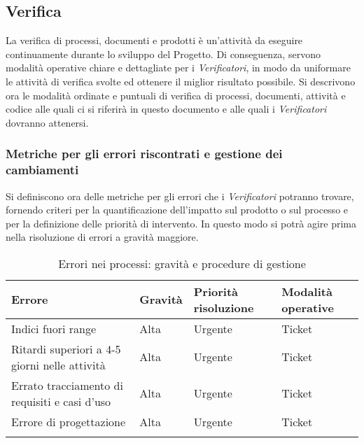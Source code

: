 {	\subsection{Verifica}
La verifica di processi, documenti e prodotti è un'attività da eseguire continuamente durante lo sviluppo del Progetto. Di conseguenza, servono modalità operative chiare e dettagliate per i \emph{Verificatori}, in modo da uniformare le attività di verifica svolte ed ottenere il miglior risultato possibile. Si descrivono ora le modalità ordinate e puntuali di verifica di processi, documenti, attività e codice alle quali ci si riferirà in questo documento e alle quali i \emph{Verificatori} dovranno attenersi.

	\subsubsection{Metriche per gli errori riscontrati e gestione dei cambiamenti}
Si definiscono ora delle metriche per gli errori che i \emph{Verificatori} potranno trovare, fornendo criteri per la quantificazione dell’impatto sul prodotto o sul processo e per la definizione delle priorità di intervento. In questo modo si potrà agire prima nella risoluzione di errori a gravità maggiore.


\begin{longtable}[c]{|>{\centering\arraybackslash}m{6cm} | >{\centering\arraybackslash}m{3cm} | >{\centering\arraybackslash}m{3cm} | >{\centering\arraybackslash}m{3cm} |}

 \hline
 \textbf{Errore} & \textbf{Gravità} & \textbf{Priorità risoluzione} & \textbf{Modalità operative}\\
 \hline
 Indici fuori range & Alta & Urgente & Ticket\\
 \hline
 Ritardi superiori a 4-5 giorni nelle attività & Alta & Urgente & Ticket\\
 \hline
 Errato tracciamento di requisiti e casi d'uso & Alta & Urgente & Ticket\\ 
 \hline
 Errore di progettazione & Alta & Urgente & Ticket\\
 \hline
		\caption{Errori nei processi: gravità e procedure di gestione \label{tab:ErroriProcessi}}\\
\end{longtable}


\begin{longtable}[c]{|>{\centering\arraybackslash}m{6cm} | >{\centering\arraybackslash}m{3cm} | >{\centering\arraybackslash}m{3cm} | >{\centering\arraybackslash}m{3cm} |}
 

\end{longtable}}
